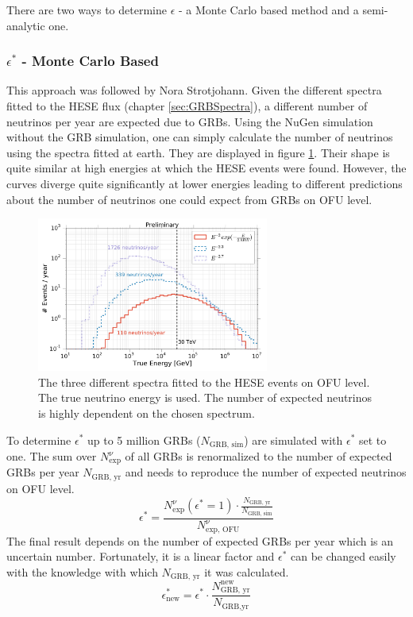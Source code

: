 There are two ways to determine $\epsilon$ - a Monte Carlo based method and a 
semi-analytic one.

\subsubsection{$\epsilon^*$ - Monte Carlo Based}
This approach was followed by Nora Strotjohann. Given the different
spectra fitted to the HESE flux (chapter \ref{sec:GRBSpectra}), a different
number of neutrinos per year are expected due to GRBs. Using the NuGen
simulation without the GRB simulation, one can simply calculate the number of
neutrinos using the spectra fitted at earth. They are displayed in figure
\ref{fig:Espectra}. Their shape is quite similar at high energies at which the
HESE events were found. However, the curves diverge quite significantly at
lower energies leading to different predictions about the number of neutrinos
one could expect from GRBs on OFU level.

\begin{figure}[h]
\centering
 \captionsetup{width=.68\textwidth}
\includegraphics[width=0.68\textwidth]{fig/Spectra_on_OFU.pdf}
    \caption{The three different spectra fitted to the HESE events on OFU
level. The true neutrino energy is used. The number of expected neutrinos is
highly dependent on the chosen spectrum.}
\label{fig:Espectra}
\end{figure}

To determine $\epsilon^*$ up to 5 million GRBs ($N_\text{GRB, sim}$) are
simulated with $\epsilon^*$ set to one. The sum over $N_\text{exp}^\nu$ of all
GRBs is renormalized to the number of expected GRBs per year
$N_\text{GRB, yr}$ and needs to reproduce the number of expected neutrinos on
OFU level.
\begin{equation}
\epsilon^*  = \frac{N_\text{exp}^\nu (\epsilon^* = 1) \cdot
\frac{N_\text{GRB, yr}}{N_\text{GRB, sim}}}{N_{\text{exp, OFU}}^\nu}
\end{equation}
The final result depends on the number of expected GRBs per year which is an
uncertain number. Fortunately, it is a linear factor and $\epsilon^*$ can be
changed easily with the knowledge with which $N_\text{GRB, yr}$ it was
calculated.
\begin{equation}
 \epsilon_\text{new}^* = \epsilon^* \cdot \frac{N_\text{GRB,
yr}^\text{new}}{N_\text{GRB,yr}}
\end{equation}



